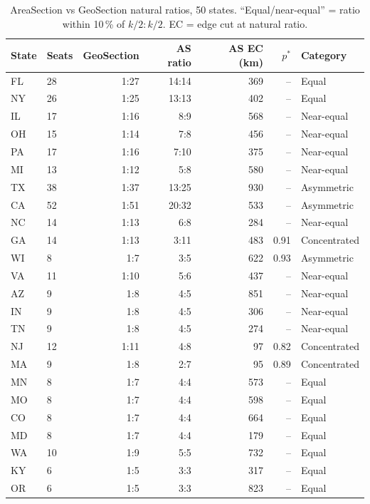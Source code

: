 \begin{table}[h]
\centering
\caption{AreaSection vs GeoSection natural ratios, 50 states.
  ``Equal/near-equal'' = ratio within 10\,\% of $k/2:k/2$.
  EC = edge cut at natural ratio.}
\label{tab:natural-ratios}
\small
\begin{tabular}{llrrrrl}
\toprule
State & Seats & GeoSection & AS ratio & AS EC (km) & $p^*$ & Category \\
\midrule
FL  & 28 & 1:27 & 14:14 & 369 & -- & Equal \\
NY  & 26 & 1:25 & 13:13 & 402 & -- & Equal \\
IL  & 17 & 1:16 & 8:9   & 568 & -- & Near-equal \\
OH  & 15 & 1:14 & 7:8   & 456 & -- & Near-equal \\
PA  & 17 & 1:16 & 7:10  & 375 & -- & Near-equal \\
MI  & 13 & 1:12 & 5:8   & 580 & -- & Near-equal \\
TX  & 38 & 1:37 & 13:25 & 930 & -- & Asymmetric \\
CA  & 52 & 1:51 & 20:32 & 533 & -- & Asymmetric \\
NC  & 14 & 1:13 & 6:8   & 284 & -- & Near-equal \\
GA  & 14 & 1:13 & 3:11  & 483 & 0.91 & Concentrated \\
WI  &  8 & 1:7  & 3:5   & 622 & 0.93 & Asymmetric \\  %
VA  & 11 & 1:10 & 5:6   & 437 & -- & Near-equal \\
AZ  &  9 & 1:8  & 4:5   & 851 & -- & Near-equal \\
IN  &  9 & 1:8  & 4:5   & 306 & -- & Near-equal \\
TN  &  9 & 1:8  & 4:5   & 274 & -- & Near-equal \\
NJ  & 12 & 1:11 & 4:8   & 97  & 0.82 & Concentrated \\
MA  &  9 & 1:8  & 2:7   & 95  & 0.89 & Concentrated \\
MN  &  8 & 1:7  & 4:4   & 573 & -- & Equal \\
MO  &  8 & 1:7  & 4:4   & 598 & -- & Equal \\
CO  &  8 & 1:7  & 4:4   & 664 & -- & Equal \\
MD  &  8 & 1:7  & 4:4   & 179 & -- & Equal \\
WA  & 10 & 1:9  & 5:5   & 732 & -- & Equal \\
KY  &  6 & 1:5  & 3:3   & 317 & -- & Equal \\
OR  &  6 & 1:5  & 3:3   & 823 & -- & Equal \\

\end{tabular}
\end{table}
